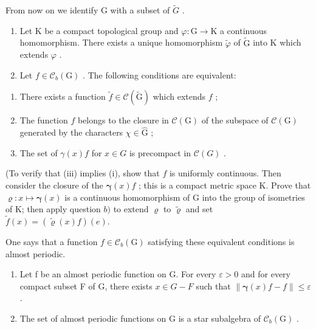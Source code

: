 From now on we identify G with a subset of \(\widetilde{G}\) .

\begin{enumerate}
\def\labelenumi{\alph{enumi})}
\setcounter{enumi}{1}
\item
  Let K be a compact topological group and \(\varphi\colon\mathrm{G}\to\mathrm{K}\) a continuous homomorphism. There exists a unique homomorphism \(\widetilde{\varphi}\) of \(\widetilde{\mathrm{G}}\) into K which extends \(\varphi\) .
\item
  Let \(f \in \mathcal{C}_b(\mathrm{G})\) . The following conditions are equivalent:
\end{enumerate}

\begin{enumerate}
\def\labelenumi{(\roman{enumi})}
\item
  There exists a function \(\widetilde{f} \in \mathcal{C}(\widetilde{\mathrm{G}})\) which extends \(f\) ;
\item
  The function \(f\) belongs to the closure in \(\mathcal{C}(\mathrm{G})\) of the subspace of \(\mathcal{C}(\mathrm{G})\) generated by the characters \(\chi\in\widehat{\mathrm{G}}\) ;
\item
  The set of \(\gamma(x)f\) for \(x\in G\) is precompact in \(\mathcal{C}(G)\) .
\end{enumerate}

(To verify that (iii) implies (i), show that \(f\) is uniformly continuous. Then consider the closure of the \(\pmb{\gamma}(x)f\) ; this is a compact metric space K. Prove that \(\varrho \colon x \mapsto \pmb{\gamma}(x)\) is a continuous homomorphism of G into the group of isometries of K; then apply question \(b)\) to extend \(\varrho\) to \(\widetilde{\varrho}\) and set \(\widetilde{f}(x) = (\widetilde{\varrho}(x)f)(e).\)

One says that a function \(f \in \mathcal{C}_b(\mathrm{G})\) satisfying these equivalent conditions is almost periodic.

\begin{enumerate}
\def\labelenumi{\alph{enumi})}
\setcounter{enumi}{3}
\item
  Let f be an almost periodic function on G. For every \(\varepsilon > 0\) and for every compact subset F of G, there exists \(x \in G - F\) such that \(\|\boldsymbol{\gamma}(x)f - f\| \leqslant \varepsilon\) .
\item
  The set of almost periodic functions on G is a star subalgebra of \(\mathcal{C}_{b}(\mathrm{G})\) .
\end{enumerate}

